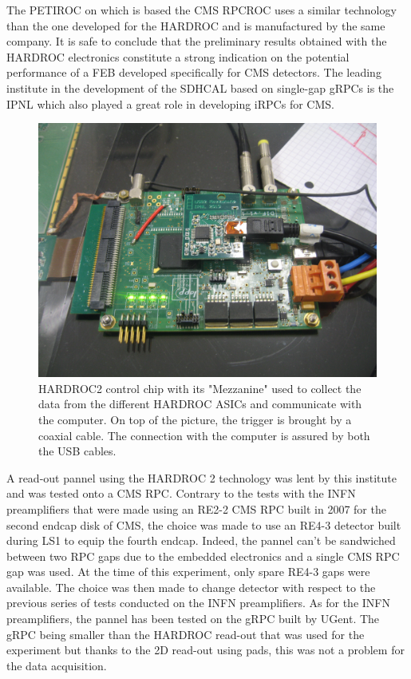 	The PETIROC on which is based the CMS RPCROC uses a similar technology than the one developed for the HARDROC and is manufactured by the same company. It is safe to conclude that the preliminary results obtained with the HARDROC electronics constitute a strong indication on the potential performance of a FEB developed specifically for CMS detectors. The leading institute in the development of the SDHCAL based on single-gap \acf{gRPCs} is the IPNL which also played a great role in developing iRPCs for CMS.
	
\begingroup\setlength{\intextsep}{5pt}\setlength{\columnsep}{15pt}

	\begin{figure}
	    \centering
		\includegraphics[width = \linewidth]{fig/chapt6/HARDROC_chip.JPG}
		\caption{\label{fig:HARDROC2-chip} HARDROC2 control chip with its "Mezzanine" used to collect the data from the different HARDROC ASICs and communicate with the computer. On top of the picture, the trigger is brought by a coaxial cable. The connection with the computer is assured by both the USB cables.}
    \end{figure}
	
	A read-out pannel using the HARDROC 2 technology was lent by this institute and was tested onto a CMS RPC. Contrary to the tests with the INFN preamplifiers that were made using an RE2-2 CMS RPC built in 2007 for the second endcap disk of CMS, the choice was made to use an RE4-3 detector built during LS1 to equip the fourth endcap. Indeed, the pannel can't be sandwiched between two RPC gaps due to the embedded electronics and a single CMS RPC gap was used. At the time of this experiment, only spare RE4-3 gaps were available. The choice was then made to change detector with respect to the previous series of tests conducted on the INFN preamplifiers. As for the INFN preamplifiers, the pannel has been tested on the gRPC built by UGent. The gRPC being smaller than the HARDROC read-out that was used for the experiment but thanks to the 2D read-out using pads, this was not a problem for the data acquisition.
	
